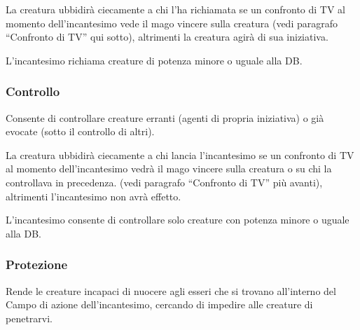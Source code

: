 La creatura ubbidir\`a ciecamente a chi l'ha richiamata se un
confronto di TV al momento dell'incantesimo vede il mago vincere sulla
creatura (vedi paragrafo ``Confronto di TV'' qui sotto), altrimenti la
creatura agir\`a di sua iniziativa.

L'incantesimo richiama creature di potenza minore o uguale alla DB. 



\subsubsection{Controllo} 

Consente di controllare creature erranti (agenti di propria
iniziativa) o gi\`a evocate (sotto il controllo di altri).

La creatura ubbidir\`a ciecamente a chi lancia l'incantesimo se un
confronto di TV al momento dell'incantesimo vedr\`a il mago vincere
sulla creatura o su chi la controllava in precedenza. (vedi paragrafo
``Confronto di TV'' pi\`u avanti), altrimenti l'incantesimo non avr\`a
effetto. 

L'incantesimo consente di controllare solo creature con potenza minore
o uguale alla DB.




\subsubsection{Protezione}

Rende le creature incapaci di nuocere agli esseri che si trovano
all'interno del Campo di azione dell'incantesimo, cercando di impedire
alle creature di penetrarvi.

